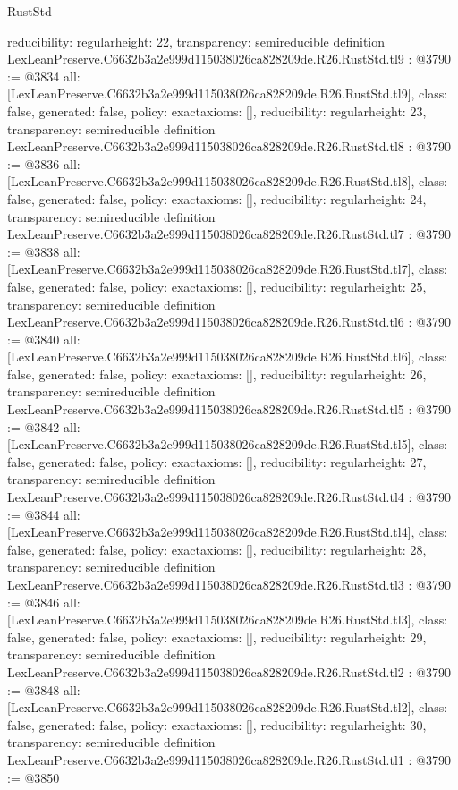 \begin{lexlean}{RustStd}
\begin{coremodule}
{  reducibility: regular{height: 22},
  transparency: semireducible
}
definition LexLeanPreserve.C6632b3a2e999d115038026ca828209de.R26.RustStd.tl9 : @3790 := @3834 {
  all: [LexLeanPreserve.C6632b3a2e999d115038026ca828209de.R26.RustStd.tl9],
  class: false,
  generated: false,
  policy: exact{axioms: []},
  reducibility: regular{height: 23},
  transparency: semireducible
}
definition LexLeanPreserve.C6632b3a2e999d115038026ca828209de.R26.RustStd.tl8 : @3790 := @3836 {
  all: [LexLeanPreserve.C6632b3a2e999d115038026ca828209de.R26.RustStd.tl8],
  class: false,
  generated: false,
  policy: exact{axioms: []},
  reducibility: regular{height: 24},
  transparency: semireducible
}
definition LexLeanPreserve.C6632b3a2e999d115038026ca828209de.R26.RustStd.tl7 : @3790 := @3838 {
  all: [LexLeanPreserve.C6632b3a2e999d115038026ca828209de.R26.RustStd.tl7],
  class: false,
  generated: false,
  policy: exact{axioms: []},
  reducibility: regular{height: 25},
  transparency: semireducible
}
definition LexLeanPreserve.C6632b3a2e999d115038026ca828209de.R26.RustStd.tl6 : @3790 := @3840 {
  all: [LexLeanPreserve.C6632b3a2e999d115038026ca828209de.R26.RustStd.tl6],
  class: false,
  generated: false,
  policy: exact{axioms: []},
  reducibility: regular{height: 26},
  transparency: semireducible
}
definition LexLeanPreserve.C6632b3a2e999d115038026ca828209de.R26.RustStd.tl5 : @3790 := @3842 {
  all: [LexLeanPreserve.C6632b3a2e999d115038026ca828209de.R26.RustStd.tl5],
  class: false,
  generated: false,
  policy: exact{axioms: []},
  reducibility: regular{height: 27},
  transparency: semireducible
}
definition LexLeanPreserve.C6632b3a2e999d115038026ca828209de.R26.RustStd.tl4 : @3790 := @3844 {
  all: [LexLeanPreserve.C6632b3a2e999d115038026ca828209de.R26.RustStd.tl4],
  class: false,
  generated: false,
  policy: exact{axioms: []},
  reducibility: regular{height: 28},
  transparency: semireducible
}
definition LexLeanPreserve.C6632b3a2e999d115038026ca828209de.R26.RustStd.tl3 : @3790 := @3846 {
  all: [LexLeanPreserve.C6632b3a2e999d115038026ca828209de.R26.RustStd.tl3],
  class: false,
  generated: false,
  policy: exact{axioms: []},
  reducibility: regular{height: 29},
  transparency: semireducible
}
definition LexLeanPreserve.C6632b3a2e999d115038026ca828209de.R26.RustStd.tl2 : @3790 := @3848 {
  all: [LexLeanPreserve.C6632b3a2e999d115038026ca828209de.R26.RustStd.tl2],
  class: false,
  generated: false,
  policy: exact{axioms: []},
  reducibility: regular{height: 30},
  transparency: semireducible
}
definition LexLeanPreserve.C6632b3a2e999d115038026ca828209de.R26.RustStd.tl1 : @3790 := @3850 {
}
\end{coremodule}
\end{lexlean}
